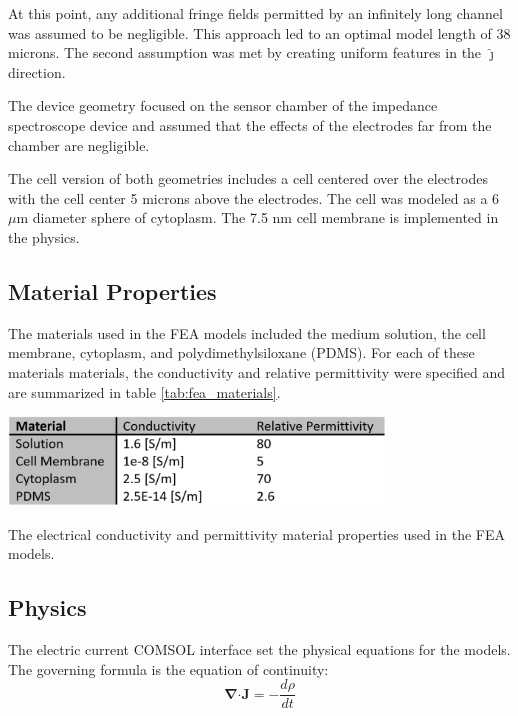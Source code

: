 \noindent At this point, any additional fringe fields permitted by an infinitely long channel was assumed to be negligible. This approach led to an optimal model length of 38 microns. The second assumption was met by creating uniform features in the $\hat{\boldsymbol\jmath}$ direction.

\par The device geometry focused on the sensor chamber of the impedance spectroscope device and assumed that the effects of the electrodes far from the chamber are negligible. 


\par The cell version of both geometries includes a cell centered over the electrodes with the cell center 5 microns above the electrodes. The cell was modeled as a 6 $\mu$m diameter sphere of cytoplasm. The 7.5 nm cell membrane is implemented in the physics. 

\subsection*{Material Properties}
\par The materials used in the FEA models included the medium solution, the cell membrane, cytoplasm, and polydimethylsiloxane (PDMS). For each of these materials materials, the conductivity and relative permittivity were specified and are summarized in table \ref{tab:fea_materials}.

\begin{table}[h]
    \centering
    \includegraphics[width=0.75\textwidth]{images/materialpropertiestable.png}
    \caption[FEA material properties]{The electrical conductivity and permittivity material properties used in the FEA models.}
    \label{tab:fea_materials}
\end{table}

\subsection*{Physics}
\par The electric current COMSOL interface set the physical equations for the models. The governing formula is the equation of continuity:
\begin{equation}
    \boldsymbol\nabla \boldsymbol\cdot \boldsymbol J = -\frac{d\rho}{dt}
\end{equation}

